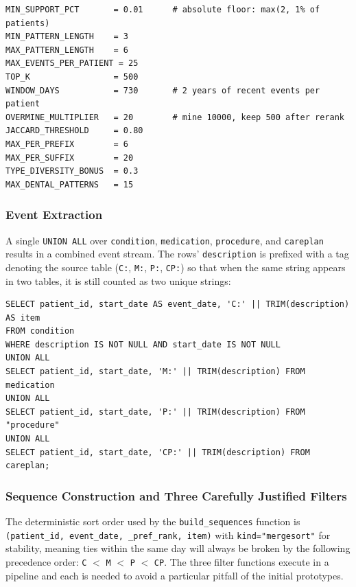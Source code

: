 \begin{lstlisting}[style=pythonstyle]
MIN_SUPPORT_PCT       = 0.01      # absolute floor: max(2, 1% of patients)
MIN_PATTERN_LENGTH    = 3
MAX_PATTERN_LENGTH    = 6
MAX_EVENTS_PER_PATIENT = 25
TOP_K                 = 500
WINDOW_DAYS           = 730       # 2 years of recent events per patient
OVERMINE_MULTIPLIER   = 20        # mine 10000, keep 500 after rerank
JACCARD_THRESHOLD     = 0.80
MAX_PER_PREFIX        = 6
MAX_PER_SUFFIX        = 20
TYPE_DIVERSITY_BONUS  = 0.3
MAX_DENTAL_PATTERNS   = 15

\end{lstlisting}

\subsubsection*{Event Extraction}

A single \texttt{UNION ALL} over \texttt{condition}, \texttt{medication}, \texttt{procedure}, and \texttt{careplan} results in a combined event stream. The rows' \texttt{description} is prefixed with a tag denoting the source table (\texttt{C:}, \texttt{M:}, \texttt{P:}, \texttt{CP:}) so that when the same string appears in two tables, it is still counted as two unique strings:

\begin{lstlisting}[style=sqlstyle]
SELECT patient_id, start_date AS event_date, 'C:' || TRIM(description) AS item
FROM condition
WHERE description IS NOT NULL AND start_date IS NOT NULL
UNION ALL
SELECT patient_id, start_date, 'M:' || TRIM(description) FROM medication
UNION ALL
SELECT patient_id, start_date, 'P:' || TRIM(description) FROM "procedure"
UNION ALL
SELECT patient_id, start_date, 'CP:' || TRIM(description) FROM careplan;

\end{lstlisting}

\subsubsection*{Sequence Construction and Three Carefully Justified Filters}

The deterministic sort order used by the \texttt{build\_sequences} function is \texttt{(patient\_id, event\_date, \_pref\_rank, item)} with \texttt{kind="mergesort"} for stability, meaning ties within the same day will always be broken by the following precedence order: \texttt{C} \(<\) \texttt{M} \(<\) \texttt{P} \(<\) \texttt{CP}. The three filter functions execute in a pipeline and each is needed to avoid a particular pitfall of the initial prototypes.

